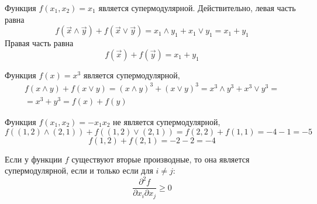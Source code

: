 \begin{myex} Функция $ f(x_{1},x_{2})=x_{1} $ является супермодулярной. Действительно, левая часть равна
\begin{equation}
f(\vec{x}\wedge\vec{y})+f(\vec{x}\vee\vec{y})=x_{1}\wedge y_{1}+x_{1}\vee y_{1}=x_{1}+y_{1}
\end{equation}
Правая часть равна
\begin{equation}
f(\vec{x})+f(\vec{y})=x_{1}+y_{1}
\end{equation}
\end{myex}

\begin{myex} Функция $ f(x)=x^{3} $ является супермодулярной,
\begin{multline}
f(x\wedge y)+f(x \vee y)=(x\wedge y)^{3}+(x\vee y)^{3}=x^{3}\wedge y^{3} + x^{3}\vee y^{3}=\\
=x^{3}+y^{3}=f(x)+f(y)
\end{multline}
\end{myex}

\begin{myex} Функция $ f(x_{1},x_{2})=-x_{1}x_{2} $ не является супермодулярной,
\begin{equation}
f((1,2)\wedge (2,1))+f((1,2)\vee (2,1))=f(2,2)+f(1,1)=-4-1=-5
\end{equation}
\begin{equation}
f(1,2)+f(2,1)=-2-2=-4
\end{equation}


\end{myex}




\begin{myth} Если у функции $ f $ существуют вторые производные, то она является супермодулярной, если и только если для $ i\neq j $:
\label{supermod_crit} 
\begin{equation}
\frac{\partial^{2}f}{\partial x_{i}\partial x_{j}}\geq 0
\end{equation}
\end{myth}

